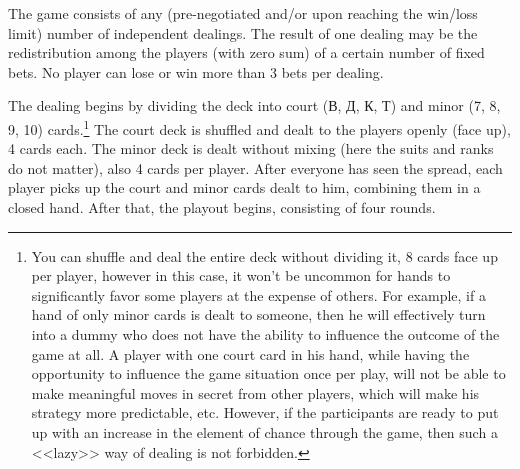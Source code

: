The game consists of any (pre-negotiated and/or upon reaching the win/loss limit) number of independent dealings. The result of one dealing may be the redistribution among the players (with zero sum) of a certain number of fixed bets. No player can lose or win more than 3 bets per dealing. %

The dealing begins by dividing the deck into court (В, Д, К, Т) and minor (7, 8, 9, 10) cards.\footnote{You can shuffle and deal the entire deck without dividing it, 8 cards face up per player, however in this case, it won't be uncommon for hands to significantly favor some players at the expense of others. For example, if a hand of only minor cards is dealt to someone, then he will effectively turn into a dummy who does not have the ability to influence the outcome of the game at all. A player with one court card in his hand, while having the opportunity to influence the game situation once per play, will not be able to make meaningful moves in secret from other players, which will make his strategy more predictable, etc. However, if the participants are ready to put up with an increase in the element of chance through the game, then such a <<lazy>> way of dealing is not forbidden.} The court deck is shuffled and dealt to the players openly (face up), 4 cards each. The minor deck is dealt without mixing (here the suits and ranks do not matter), also 4 cards per player. After everyone has seen the spread, each player picks up the court and minor cards dealt to him, combining them in a closed hand. After that, the playout begins, consisting of four rounds. %

